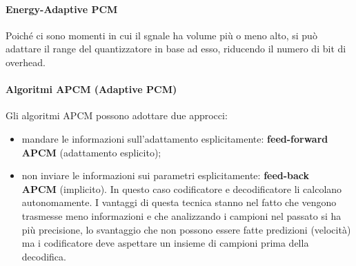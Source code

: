 \documentclass{article}
\begin{document}
				\paragraph{Energy-Adaptive PCM}
					Poiché ci sono momenti in cui il sgnale ha volume più o meno alto, si può adattare il range del quantizzatore in base ad esso, riducendo il numero di bit di overhead.
					\begin{figure}[ht!]
					\end{figure}

				\paragraph{Algoritmi APCM (Adaptive PCM)}
					Gli algoritmi APCM possono adottare due approcci:
					\begin{itemize}
						\item mandare le informazioni sull'adattamento esplicitamente: \textbf{feed-forward APCM} (adattamento esplicito);
						\item non inviare le informazioni sui parametri esplicitamente: \textbf{feed-back \\APCM} (implicito). In questo caso codificatore e decodificatore li calcolano autonomamente. I vantaggi di questa tecnica stanno nel fatto che vengono trasmesse meno informazioni e che analizzando i campioni nel passato si ha più precisione, lo svantaggio che non possono essere fatte predizioni (velocità) ma i codificatore deve aspettare un insieme di campioni prima della decodifica.
					\end{itemize}
\end{document}
